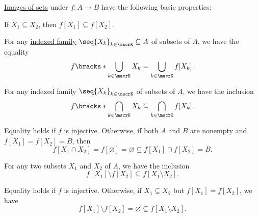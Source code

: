 \begin{proposition}\label{thm:function_image_properties}
  \hyperref[def:set_valued_function/image]{Images of sets} under \( f: A \to B \) have the following basic properties:
  \begin{thmenum}
     If \( X_1 \subseteq X_2 \), then \( f[X_1] \subseteq f[X_2] \).

     For any \hyperref[def:indexed_family]{indexed family} \( \seq{ X_k }_{k \in \mscrK} \subseteq A \) of subsets of \( A \), we have the equality
    \begin{equation}\label{eq:thm:function_image_properties/union}
      f\bracks*{ \bigcup_{k \in \mscrK} X_k } = \bigcup_{k \in \mscrK} f[X_k].
    \end{equation}

     For any indexed family \( \seq{ X_k }_{k \in \mscrK} \) of subsets of \( A \), we have the inclusion
    \begin{equation}\label{eq:thm:function_image_properties/intersection}
      f\bracks*{ \bigcap_{k \in \mscrK} X_k } \subseteq \bigcap_{k \in \mscrK} f[X_k].
    \end{equation}

    Equality holds if \( f \) is \hyperref[def:function_invertibility/injective]{injective}. Otherwise, if both \( A \) and \( B \) are nonempty and \( f[X_1] = f[X_2] = B \), then
    \begin{equation*}
      f[X_1 \cap X_2] = f[\varnothing] = \varnothing \subsetneq f[X_1] \cap f[X_2] = B.
    \end{equation*}

     For any two subsets \( X_1 \) and \( X_2 \) of \( A \), we have the inclusion
    \begin{equation}\label{eq:thm:function_image_properties/difference}
      f[X_1] \setminus f[X_2] \subseteq f[X_1 \setminus X_2].
    \end{equation}

    Equality holds if \( f \) is injective. Otherwise, if \( X_1 \subsetneq X_2 \) but \( f[X_1] = f[X_2] \), we have
    \begin{equation*}
      f[X_1] \setminus f[X_2] = \varnothing \subsetneq f[X_1 \setminus X_2].
    \end{equation*}
  \end{thmenum}
\end{proposition}
